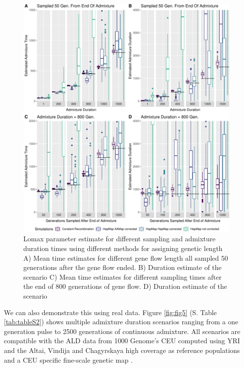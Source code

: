 \documentclass[]{article}
\begin{document}
\begin{figure}
\centering
\includegraphics{Admixture_Time_Inference_Paper_Draft_files/figure-latex/fig4-1.pdf}
\caption{\label{fig:fig4} Lomax parameter estimate for different sampling and
admixture duration times using different methods for assigning genetic
length A) Mean time estimates for different gene
flow length all sampled 50 generations after the gene flow ended. B)
Duration estimate of the scenario C) Mean time estimates for different sampling times after the end of 800
generations of gene flow. D) Duration estimate of the scenario}
\end{figure}


We can also demonstrate this using real data.
Figure \ref{fig:fig5} (S. Table \ref{tab:tableS2}) shows multiple admixture duration scenarios ranging from a one generation pulse to 2500 generations of continuous admixture. All scenarios are compatible with the ALD data from 1000 Genome's CEU computed using YRI and the Altai, Vindija and Chagyrskaya high coverage as reference populations and a CEU specific fine-scale genetic map \citep{spence_inference_2019}.
\end{document}
